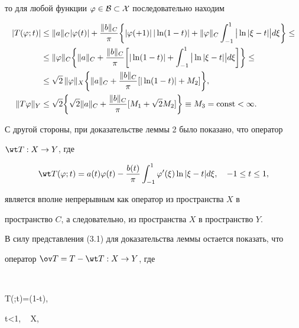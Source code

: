 то для любой функции $\varphi\in \cal B \subset X$ последовательно находим


\begin{align*}


| T(\varphi;t)|&\leq\| a\|_C|\varphi(t)|+\frac


{\| b\|_C}{\pi}\bigg\{|\varphi(+1)|\,|\ln(1-t)|+\|


\varphi\|_C\int_{-1}^1\big|\ln|\xi-t|\big| d\xi\bigg\}\leq \\


%


&\leq\|\varphi\|_C\bigg\{\| a\|_C+\frac{\| b\|_C}{\pi}


\bigg[|\ln(1-t)|+\int_{-1}^1\big|\ln|\xi-t|\big| d\xi\bigg]\bigg\}\leq \\


%


&\le \sqrt{2}\,\|\varphi\|_X\bigg\{\| a\|_C+\frac{\| b\|_C}


{\pi}[|\ln(1-t)|+M_2]\bigg\}, \\


%


\| T\varphi\|_Y&\leq\sqrt{2}\bigg\{\sqrt{2}\| a\|_C+\frac{\| b


\|_C}{\pi}[M_1+\sqrt{2}M_2]\bigg\}\equiv M_3=\const<\infty. 


\end{align*}





С другой стороны, при доказательстве леммы 2 было показано, что оператор


$\wt T:X\to Y$, где


$$


\wt T(\varphi;t)=a(t)\varphi(t)-\frac{b(t)}{\pi}\int_{-1}^1\varphi'


(\xi)\ln|\xi-t| d\xi, \quad -1\leq t\leq 1, 


$$


является вполне непрерывным как оператор из пространства $X$ в 


пространство $C$, а следовательно, из пространства $X$ в пространство $Y$.


В силу представления (3.1) для доказательства леммы остается показать, что 


оператор $\ov T=T-\wt T:X\to Y$, где


$$


\ov T(\varphi;t)=\ln(1-t),


\leq t<1, \ \; \varphi\in X, 



